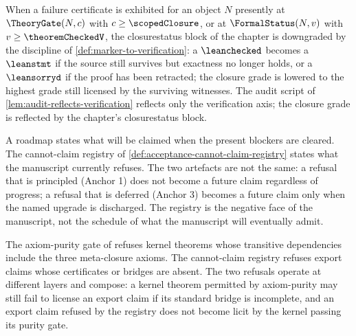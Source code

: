 \begin{remark}
\label{rem:acceptance-audit-failure-policy}
When a failure certificate is exhibited for an object $N$ presently at $\TheoryGate(N, c)$ with $c \ge \scopedClosure$, or at $\FormalStatus(N, v)$ with $v \ge \theoremCheckedV$, the closurestatus block of the chapter is downgraded by the discipline of \autoref{def:marker-to-verification}: a $\verb|\leanchecked|$ becomes a $\verb|\leanstmt|$ if the source still survives but exactness no longer holds, or a $\verb|\leansorryd|$ if the proof has been retracted; the closure grade is lowered to the highest grade still licensed by the surviving witnesses. The audit script of \autoref{lem:audit-reflects-verification} reflects only the verification axis; the closure grade is reflected by the chapter's closurestatus block.
\end{remark}

\begin{remark}
\label{rem:acceptance-not-roadmap}
A roadmap states what will be claimed when the present blockers are cleared. The cannot-claim registry of \autoref{def:acceptance-cannot-claim-registry} states what the manuscript currently refuses. The two artefacts are not the same: a refusal that is principled (Anchor 1) does not become a future claim regardless of progress; a refusal that is deferred (Anchor 3) becomes a future claim only when the named upgrade is discharged. The registry is the negative face of the manuscript, not the schedule of what the manuscript will eventually admit.
\end{remark}

\begin{remark}
\label{rem:acceptance-compose-axiom-purity}
The axiom-purity gate of  refuses kernel theorems whose transitive dependencies include the three meta-closure axioms. The cannot-claim registry refuses export claims whose certificates or bridges are absent. The two refusals operate at different layers and compose: a kernel theorem permitted by axiom-purity may still fail to license an export claim if its standard bridge is incomplete, and an export claim refused by the registry does not become licit by the kernel passing its purity gate.
\end{remark}
